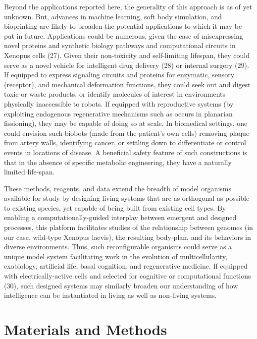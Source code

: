 Beyond the applications reported here, the generality of this approach is as of yet unknown. But, advances in machine learning, soft body simulation, and bioprinting are likely to broaden the potential applications to which it may be put in future. Applications could be numerous, given the ease of misexpressing novel proteins and synthetic biology pathways and computational circuits in Xenopus cells (27). Given their non-toxicity and self-limiting lifespan, they could serve as a novel vehicle for intelligent drug delivery (28) or internal surgery (29). If equipped to express signaling circuits and proteins for enzymatic, sensory (receptor), and mechanical deformation functions, they could seek out and digest toxic or waste products, or identify molecules of interest in environments physically inaccessible to robots. If equipped with reproductive systems (by exploiting endogenous regenerative mechanisms such as occurs in planarian fissioning), they may be capable of doing so at scale. In biomedical settings, one could envision such biobots (made from the patient's own cells) removing plaque from artery walls, identifying cancer, or settling down to differentiate or control events in locations of disease. A beneficial safety feature of such constructions is that in the absence of specific metabolic engineering, they have a naturally limited life-span. 

These methods, reagents, and data extend the breadth of model organisms available for study by designing living systems that are as orthogonal as possible to existing species, yet capable of being built from existing cell types. By enabling a computationally-guided interplay between emergent and designed processes, this platform facilitates studies of the relationship between genomes (in our case, wild-type Xenopus laevis), the resulting body-plan, and its behaviors in diverse environments. Thus, such reconfigurable organisms could serve as a unique model system facilitating work in the evolution of multicellularity, exobiology, artificial life, basal cognition, and regenerative medicine. If equipped with electrically-active cells and selected for cognitive or computational functions (30), such designed systems may similarly broaden our understanding of how intelligence can be instantiated in living as well as non-living systems.


\section{Materials and Methods}


